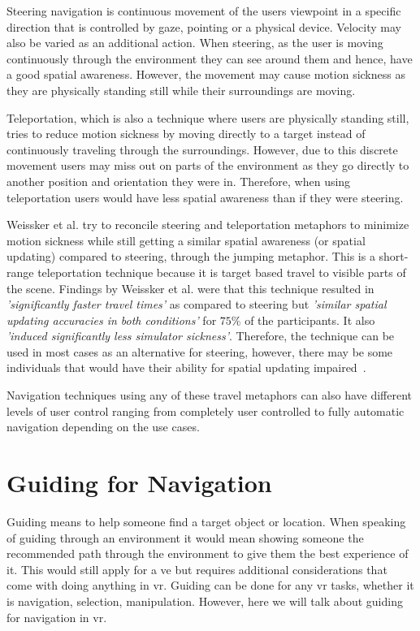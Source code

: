 Steering navigation is continuous movement of the users viewpoint in a specific direction that is controlled by gaze, pointing or a physical device. Velocity may also be varied as an additional action. When steering, as the user is moving continuously through the environment they can see around them and hence, have a good spatial awareness. However, the movement may cause motion sickness as they are physically standing still while their surroundings are moving.

Teleportation, which is also a technique where users are physically standing still, tries to reduce motion sickness by moving directly to a target instead of continuously traveling through the surroundings. However, due to this discrete movement users may miss out on parts of the environment as they go directly to another position and orientation they were in. Therefore, when using teleportation users would have less spatial awareness than if they were steering.

Weissker et al. try to reconcile steering and teleportation metaphors to minimize motion sickness while still getting a similar spatial awareness (or spatial updating) compared to steering, through the jumping metaphor. This is a short-range teleportation technique because it is target based travel to visible parts of the scene. Findings by Weissker et al. were that this technique resulted in \textit{'significantly faster travel times'} as compared to steering but \textit{'similar spatial updating accuracies in both conditions'} for $75\%$ of the participants. It also \textit{'induced significantly less	simulator sickness'}. Therefore, the technique can be used in most cases as an alternative for steering, however, there may be some individuals that would have their ability for spatial updating impaired~\cite{Weissker2018}.

Navigation techniques using any of these travel metaphors can also have different levels of user control ranging from completely user controlled to fully automatic navigation depending on the use cases.

\section{Guiding for Navigation}
\label{section RW: Guiding for Navigation}
Guiding means to help someone find a target object or location. When speaking of guiding through an environment it would mean showing someone the recommended path through the environment to give them the best experience of it. This would still apply for a \acrshort{ve} but requires additional considerations that come with doing anything in \acrfull{vr}. Guiding can be done for any \acrshort{vr} tasks, whether it is navigation, selection, manipulation. However, here we will talk about guiding for navigation in \acrshort{vr}.

